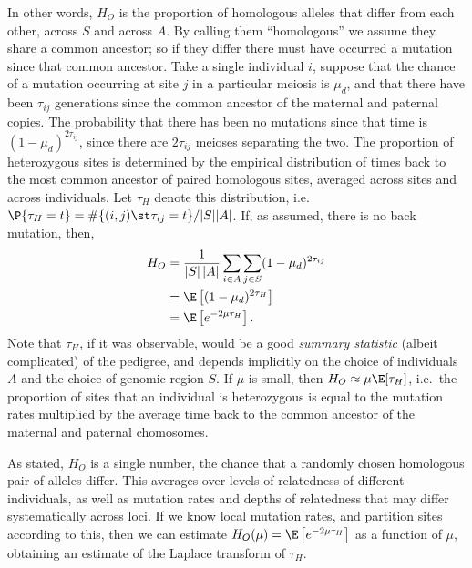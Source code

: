 In other words, $H_O$ is the proportion of homologous alleles that differ from each other, across $S$ and across $A$.
By calling them ``homologous'' we assume they share a common ancestor;
so if they differ there must have occurred a mutation since that common ancestor.
Take a single individual $i$,
suppose that the chance of a mutation occurring at site $j$ in a particular meiosis is $\mu_d$,
and that there have been $\tau_{ij}$ generations since the common ancestor of the maternal and paternal copies.
The probability that there has been no mutations since that time is $(1-\mu_d)^{2 \tau_{ij}}$,
since there are $2 \tau_{ij}$ meioses separating the two.
The proportion of heterozygous sites is determined by the empirical distribution 
of times back to the most common ancestor of paired homologous sites, averaged across sites and across individuals.
Let $\tau_H$ denote this distribution, i.e.\ $\P\{ \tau_H = t \} = \#\{ (i,j) \st \tau_{ij} = t \} / |S||A|$.
If, as assumed, there is no back mutation, then,
\begin{align}
  H_O &= \frac{1}{|S|\,|A|} \sum_{i \in A} \sum_{j \in S} (1-\mu_d)^{2 \tau_{ij}} \\
  &= \E\left[ (1-\mu_d)^{2 \tau_H} \right] \\
    &= \E\left[ e^{-2 \mu \tau_H } \right] .
\end{align}
Note that $\tau_H$, if it was observable, would be a good \emph{summary statistic} (albeit complicated) of the pedigree,
and depends implicitly on the choice of individuals $A$ and the choice of genomic region $S$.
If $\mu$ is small, then $H_O \approx \mu \E[ \tau_H ]$,
i.e.\ the proportion of sites that an individual is heterozygous
is equal to the mutation rates multiplied by the average time back to the common ancestor of the maternal and paternal chomosomes.

As stated, $H_O$ is a single number, the chance that a randomly chosen homologous pair of alleles differ.
This averages over levels of relatedness of different individuals,
as well as mutation rates and depths of relatedness that may differ systematically across loci.
If we know local mutation rates, and partition sites according to this,
then we can estimate $H_O(\mu) = \E\left[ e^{-2 \mu \tau_H } \right]$ as a function of $\mu$,
obtaining an estimate of the Laplace transform of $\tau_H$.



